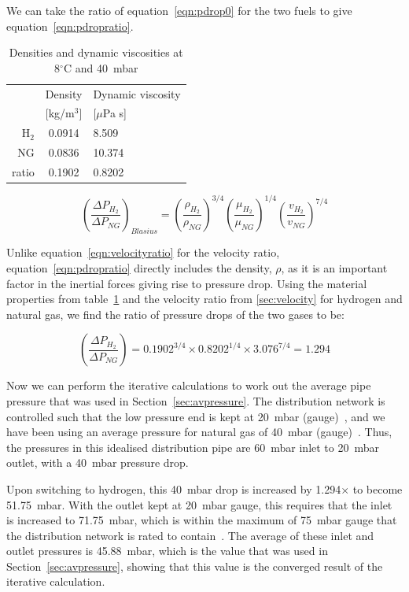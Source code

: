 \documentclass[5p]{elsarticle} %
\begin{document}
We can take the ratio of equation~\ref{eqn:pdrop0} for the two fuels to give equation~\eqref{eqn:pdropratio}.

\begin{table}
\centering
\caption{\label{tab:dyn}Densities and dynamic viscosities at 8$^\circ$C and 40~mbar }
\begin{tabular}{r|c|l}
& Density & Dynamic viscosity \\
& [kg/m$^3$] & [$\mu$Pa s] \\
\hline
H$_2$ & 0.0914 & 8.509 \\
NG & 0.0836 & 10.374 \\
\hline
ratio & 0.1902 & 0.8202
\end{tabular}
\end{table}

\begin{equation}
\label{eqn:pdropratio}
    \left(\frac{\Delta P_{H_2}}{\Delta P_{NG}}\right)_{Blasius} = 
    \left(\frac{\rho_{H_2}}{\rho_{NG}}\right)^{3/4} 
    \left(\frac{\mu_{H_2}}{\mu_{NG}}\right)^{1/4} 
    \left(\frac{v_{H_2}}{v_{NG}}\right)^{7/4}
\end{equation}

Unlike equation~\eqref{eqn:velocityratio} for the velocity ratio, equation~\eqref{eqn:pdropratio} directly includes the density, $\rho$, as it is an important factor in the inertial forces giving rise to pressure drop.
Using the material properties from table~\ref{tab:dyn} and the velocity ratio from \ref{sec:velocity} for hydrogen and natural gas, we find the ratio of pressure drops of the two gases to be:

\begin{equation}
\label{eqn:pdropratiovalue}
    \left(\frac{\Delta P_{H_2}}{\Delta P_{NG}}\right) = 
    0.1902^{3/4} \times 0.8202^{1/4} \times 3.076^{7/4} = \mathbf{1.294}
\end{equation}

Now 
we can perform the iterative calculations to work out the average pipe pressure that was used in Section~\ref{sec:avpressure}. 
The distribution network is controlled such that the low pressure end is kept at 20~mbar (gauge)~\citep{dodds2013}, and we have been using an average pressure for natural gas of 40~mbar (gauge)~\citep{utonomy23}.
Thus, the pressures in this idealised distribution pipe are 60~mbar inlet to 20~mbar outlet, with a 40~mbar pressure drop.

Upon switching to hydrogen, this 40~mbar drop is increased by 1.294$\times$ to become 51.75~mbar.
With the outlet kept at 20~mbar gauge, this requires that the inlet is increased to 71.75~mbar, which is within the maximum of 75~mbar gauge that the distribution network is rated to contain~\citep{dodds2013}.
The average of these inlet and outlet pressures is 45.88~mbar, which is the value that was used in Section~\ref{sec:avpressure}, showing that this value is the converged result of the iterative calculation.
\end{document}
